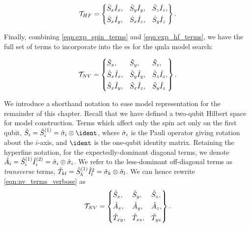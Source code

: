 \begin{equation}
    \mathcal{T}_{HF} = \left\{
    \begin{align}  
        \begin{split}
        & \hat{S}_x\hat{I}_x, && \hat{S}_y\hat{I}_y, && \hat{S}_z\hat{I}_z, \\
        & \hat{S}_x\hat{I}_y, && \hat{S}_x\hat{I}_z, && \hat{S}_y\hat{I}_z 
        \end{split}
    \end{align}
    \right\}.
    \label{eqn:exp_hf_terms}
\end{equation}

\par 

Finally, combining \cref{eqn:exp_spin_terms} and \cref{eqn:exp_hf_terms}, 
    we have the full set of terms to incorporate into the \gls{es} for the \gls{qmla} \gls{model search}: 

\begin{equation}
    \mathcal{T}_{NV} = \left\{
    \begin{align}
        & \hat{S}_x, && \hat{S}_y, && \hat{S}_z, \\
        & \hat{S}_x\hat{I}_x, && \hat{S}_y\hat{I}_y, && \hat{S}_z\hat{I}_z, \\
        & \hat{S}_x\hat{I}_y, && \hat{S}_x\hat{I}_z, && \hat{S}_y\hat{I}_z 
    \end{align}
    \right\}.
    \label{eqn:nv_terms_verbose}
\end{equation}
\par 

We introduce a shorthand notation to ease model representation for the remainder of this chapter. 
Recall that we have defined a two-qubit Hilbert space for model construction.
Terms which affect only the spin act only on the first qubit, $\hat{S}_i = \hat{S}_i^{(1)} = \s_i \otimes \ident$, 
    where $\hat{\sigma}_i$ is the Pauli operator giving rotation about the $i$-axis, and 
    $\ident$ is the one-qubit identity matrix. 
Retaining the hyperfine notation, for the expectedly-dominant diagonal terms, we denote $\hat{A}_i = \hat{S}_i^{(1)} \hat{I}_i^{(2)} = \hat{\sigma}_i \otimes \hat{\sigma}_i$. 
We refer to the less-dominant off-diagonal terms as \emph{transverse} terms, $\hat{T}_{kl} = \hat{S}_k^{(1)} \hat{I}_l^{2} = \hat{\sigma}_k \otimes \hat{\sigma}_l$. 
We can hence rewrite \cref{eqn:nv_terms_verbose} as 
\begin{equation}
    \label{eqn:nv_terms}
    \mathcal{T}_{NV} = \left\{ 
        \begin{split}    
            &\hat{S}_x, && \hat{S}_y,  && \hat{S}_z, \\
            &\hat{A}_x,  && \hat{A}_y,  && \hat{A}_z, \\
            &\hat{T}_{xy},  && \hat{T}_{xz}, && \hat{T}_{yz} 
        \end{split}
    \right\}.
\end{equation}

